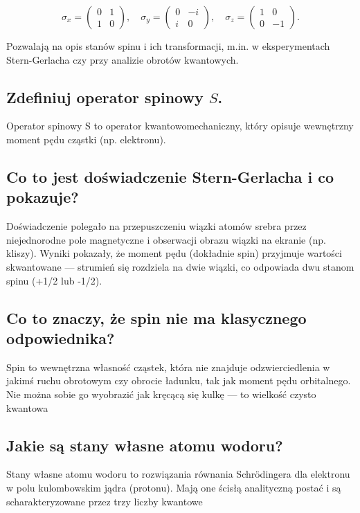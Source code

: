 \[
\sigma_x = \begin{pmatrix}
0 & 1 \\
1 & 0
\end{pmatrix}, \quad
\sigma_y = \begin{pmatrix}
0 & -i \\
i & 0
\end{pmatrix}, \quad
\sigma_z = \begin{pmatrix}
1 & 0 \\
0 & -1
\end{pmatrix}.
\]

Pozwalają na opis stanów spinu i ich transformacji, m.in. w eksperymentach Stern-Gerlacha czy przy analizie obrotów kwantowych.

\subsection{Zdefiniuj operator spinowy $S$.}

Operator spinowy S to operator kwantowomechaniczny, który opisuje wewnętrzny moment pędu cząstki (np. elektronu).

\subsection{Co to jest doświadczenie Stern-Gerlacha i co pokazuje?}

Doświadczenie polegało na przepuszczeniu wiązki atomów srebra przez niejednorodne pole magnetyczne i obserwacji obrazu wiązki na ekranie (np. kliszy). Wyniki pokazały, że moment pędu (dokładnie spin) przyjmuje wartości skwantowane — strumień się rozdziela na dwie wiązki, co odpowiada dwu stanom spinu (+1/2 lub -1/2).

\subsection{Co to znaczy, że spin nie ma klasycznego odpowiednika?}

Spin to wewnętrzna własność cząstek, która nie znajduje odzwierciedlenia w jakimś ruchu obrotowym czy obrocie ładunku, tak jak moment pędu orbitalnego. Nie można sobie go wyobrazić jak kręcącą się kulkę — to wielkość czysto kwantowa

\subsection{Jakie są stany własne atomu wodoru?}

Stany własne atomu wodoru to rozwiązania równania Schrödingera dla elektronu w polu kulombowskim jądra (protonu). Mają one ścisłą analityczną postać i są scharakteryzowane przez trzy liczby kwantowe

